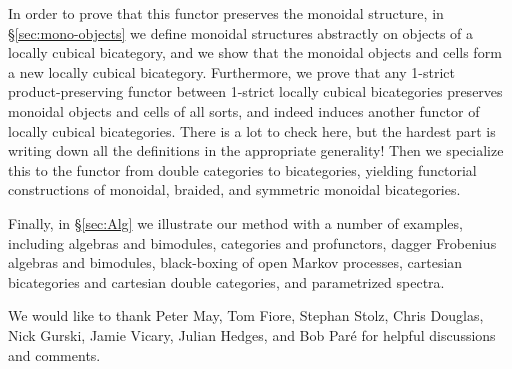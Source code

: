 In order to prove that this functor preserves the monoidal structure, in \S\ref{sec:mono-objects} we define monoidal structures abstractly on objects of a locally cubical bicategory, and we show that the monoidal objects and cells form a new locally cubical bicategory. Furthermore, we prove that any 1-strict product-preserving functor between 1-strict locally cubical bicategories preserves monoidal objects and cells of all sorts, and indeed induces another functor of locally cubical bicategories.
There is a lot to check here, but the hardest part is writing down all the definitions in the appropriate generality! Then we specialize this to the functor from double categories to bicategories, yielding functorial constructions of monoidal, braided, and symmetric monoidal bicategories.

Finally, in \S\ref{sec:Alg} we illustrate our method with a number of examples, including algebras and bimodules, categories and profunctors, dagger Frobenius algebras and bimodules, black-boxing of open Markov processes, cartesian bicategories and cartesian double categories, and parametrized spectra.

We would like to thank Peter May, Tom Fiore, Stephan Stolz, Chris
Douglas, Nick Gurski, Jamie Vicary, Julian Hedges, and Bob Par\'{e} for helpful discussions and comments.

